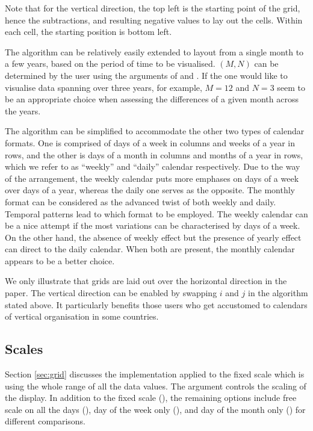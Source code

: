 \documentclass[article]{jss}
\begin{document}
Note that for the vertical direction, the top left is the starting point
of the grid, hence the subtractions, and resulting negative values to
lay out the cells. Within each cell, the starting position is bottom
left.

The algorithm can be relatively easily extended to layout from a single
month to a few years, based on the period of time to be visualised.
\((M, N)\) can be determined by the user using the arguments of
 and . If the one would like to visualise data
spanning over three years, for example, \(M = 12\) and \(N = 3\) seem to
be an appropriate choice when assessing the differences of a given month
across the years.

The algorithm can be simplified to accommodate the other two types of
calendar formats. One is comprised of days of a week in columns and
weeks of a year in rows, and the other is days of a month in columns and
months of a year in rows, which we refer to as ``weekly'' and ``daily''
calendar respectively. Due to the way of the arrangement, the weekly
calendar puts more emphases on days of a week over days of a year,
whereas the daily one serves as the opposite. The monthly format can be
considered as the advanced twist of both weekly and daily. Temporal
patterns lead to which format to be employed. The weekly calendar can be
a nice attempt if the most variations can be characterised by days of a
week. On the other hand, the absence of weekly effect but the presence
of yearly effect can direct to the daily calendar. When both are
present, the monthly calendar appears to be a better choice.

We only illustrate that grids are laid out over the horizontal direction
in the paper. The vertical direction can be enabled by swapping \(i\)
and \(j\) in the algorithm stated above. It particularly benefits those
users who get accustomed to calendars of vertical organisation in some
countries.

\subsection{Scales}\label{scales}

Section \ref{sec:grid} discusses the implementation applied to the fixed
scale which is using the whole range of all the data values. The
 argument controls the scaling of the display. In addition
to the fixed scale (), the remaining options include free
scale on all the days (), day of the week only
(), and day of the month only () for
different comparisons.
\end{document}
